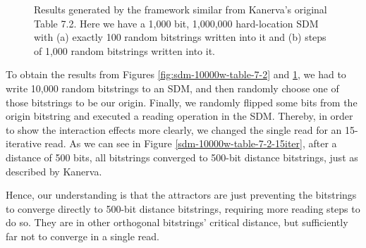 \begin{figure}[h]
\centering
{}

\caption{Results generated by the framework similar from Kanerva's original Table 7.2. Here we have a 1,000 bit, 1,000,000 hard-location SDM with (a) exactly 100 random bitstrings written into it and (b) steps of 1,000 random bitstrings written into it.
\label{fig:sdm-100w-table-7-2}}
\end{figure}

To obtain the results from Figures \ref{fig:sdm-10000w-table-7-2} and \ref{fig:sdm-100w-table-7-2}, we had to write 10,000 random bitstrings to an SDM, and then randomly choose one of those bitstrings to be our origin. Finally, we randomly flipped some bits from the origin bitstring and executed a reading operation in the SDM. Thereby, in order to show the interaction effects more clearly, we changed the single read for an 15-iterative read. As we can see in Figure \ref{sdm-10000w-table-7-2-15iter}, after a distance of 500 bits, all bitstrings converged to 500-bit distance bitstrings, just as described by Kanerva.

Hence, our understanding is that the attractors are just preventing the bitstrings to converge directly to 500-bit distance bitstrings, requiring more reading steps to do so. They are in other orthogonal bitstrings' critical distance, but sufficiently far not to converge in a single read.

